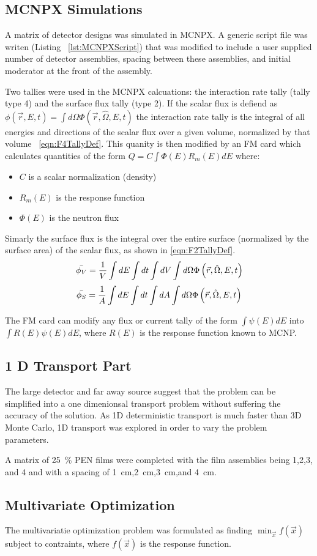 \subsection{MCNPX Simulations}
\label{sec:MCNPXMethods}
A matrix of detector designs was simulated in MCNPX.
A generic script file was writen (Listing ~\ref{lst:MCNPXScript}) that was modified to include a user supplied number of detector assemblies, spacing between these assemblies, and initial moderator at the front of the assembly.


Two tallies were used in the MCNPX calcuations: the interaction rate tally (tally type 4) and the surface flux tally (type 2).
If the scalar flux is defiend as $\phi(\vec{r},E,t)=\int d\Omega \Phi(\vec{r},\hat{\Omega},E,t)$ the  interaction rate tally is the integral of all energies and directions of the scalar flux over a given volume, normalized by that volume ~\eqref{eqn:F4TallyDef}.
This quanity is then modified by an FM card which calculates quantities of the form $Q = C \int {\Phi(E) R_m(E) dE }$ where:
\begin{itemize}
    \item $C$ is a scalar normalization (density)
    \item $R_m(E)$ is the response function
    \item $\Phi(E)$ is the neutron flux
\end{itemize}
Simarly the surface flux is the integral over the entire surface (normalized by the surface area) of the scalar flux, as shown in \eqref{eqn:F2TallyDef}.
\begin{align}
    \label{eqn:F4TallyDef}
    \bar{\phi_V} = \frac{1}{V}\int dE \int dt \int dV \int d\Omega \Phi \left ( \vec{r},\hat{\Omega},E,t \right )
\end{align}
\begin{align}
    \label{eqn:F2TallyDef}
    \bar{\phi_S} = \frac{1}{A}\int dE \int dt \int dA \int d\Omega \Phi \left ( \vec{r},\hat{\Omega},E,t \right )
\end{align}

The FM card can modify any flux or current tally of the form $\int \psi (E) dE$ into $\int R(E)\psi(E) dE$, where $R(E)$ is the response function known to MCNP.
\subsection{1 D Transport Part}
The large detector and far away source suggest that the problem can be simplified into a one dimenionsal transport problem without suffering the accuracy of the solution.
As 1D deterministic transport is much faster than 3D Monte Carlo, 1D transport was explored in order to vary the problem parameters.

A matrix of \SI{25}{\percent}  PEN films were completed with the film assemblies being 1,2,3, and 4 and with a spacing of \SI{1}{\centi\meter},\SI{2}{\centi\meter},\SI{3}{\centi\meter},and \SI{4}{\centi\meter}. 
\subsection{Multivariate Optimization}
\label{sec:MVOptimization}

The multivariatie optimization problem was formulated as finding $\min_{\vec{x}} f (\vec{x})$ subject to contraints, where $f(\vec{x})$ is the response function.
